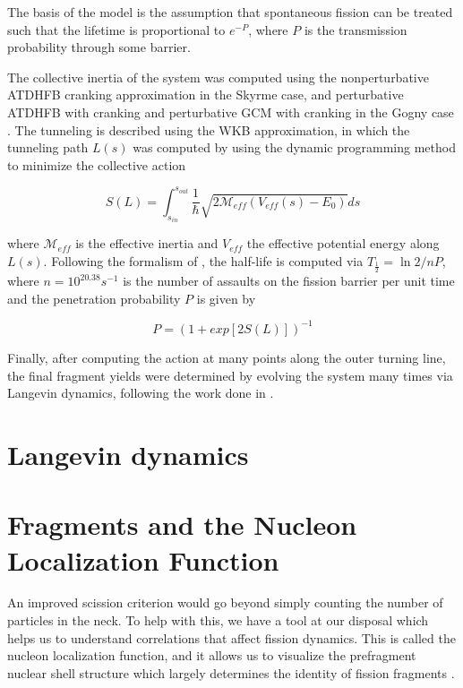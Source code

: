 The basis of the model is the assumption that spontaneous fission can be treated such that the lifetime is proportional to $e^{-P}$, where $P$ is the transmission probability through some barrier.

The collective inertia of the system was computed using the nonperturbative ATDHFB cranking approximation in the Skyrme case, and perturbative ATDHFB with cranking and perturbative GCM with cranking in the Gogny case \cite{Baran2011}. The tunneling is described using the WKB approximation, in which the tunneling path $L(s)$ was computed by using the dynamic programming method to minimize the collective action

\begin{equation}
S(L) = \int_{s_{in}}^{s_{out}} \frac{1}{\hbar}\sqrt{2\mathcal{M}_{eff}\left(V_{eff}(s)-E_0\right)}ds
\end{equation}

\noindent where $\mathcal{M}_{eff}$ is the effective inertia and $V_{eff}$ the effective potential energy along $L(s)$. Following the formalism of \cite{Sadhukhan2013}, the half-life is computed via $T_{\frac{1}{2}} = \ln 2/nP$, where $n=10^{20.38}s^{-1}$ is the number of assaults on the fission barrier per unit time and the penetration probability $P$ is given by

\begin{equation}
P = (1 + exp[2S(L)])^{-1}
\end{equation}

\noindent Finally, after computing the action at many points along the outer turning line, the final fragment yields were determined by evolving the system many times via Langevin dynamics, following the work done in \cite{Sadhukhan2016}.

\section{Langevin dynamics}


\section{Fragments and the Nucleon Localization Function}
An improved scission criterion would go beyond simply counting the number of particles in the neck. To help with this, we have a tool at our disposal which helps us to understand correlations that affect fission dynamics. This is called the nucleon localization function, and it allows us to visualize the prefragment nuclear shell structure which largely determines the identity of fission fragments \cite{Zhang2016}.

